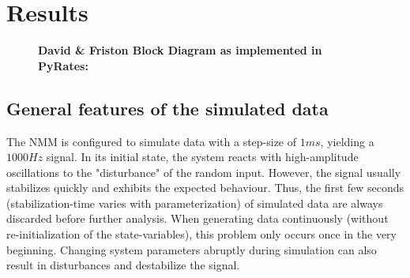 \chapter{Results}\label{ch:results}

\begin{figure}[H]

\caption{\textbf{David \& Friston Block Diagram as implemented in PyRates:}}
\label{fig:pyratesDFBlock}
\end{figure}

\section{General features of the simulated data}\label{sec:general-features-of-the-simulated-data}

The NMM is configured to simulate data with a step-size of $1 ms$, yielding a $1000 Hz$ signal.
In its initial state, the system reacts with high-amplitude oscillations to the "disturbance" of the random input.
However, the signal usually stabilizes quickly and exhibits the expected behaviour.
Thus, the first few seconds (stabilization-time varies with parameterization) of simulated data
are always discarded before further analysis.
When generating data continuously (without re-initialization of the state-variables),
this problem only occurs once in the very beginning.
Changing system parameters abruptly during simulation can also result in disturbances and destabilize the
signal.

